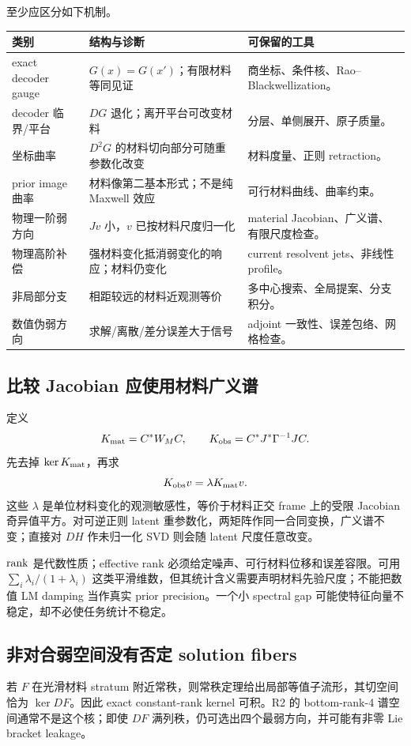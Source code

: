 至少应区分如下机制。
\begin{longtable}{p{.21\linewidth}p{.42\linewidth}p{.29\linewidth}}
\toprule
类别 & 结构与诊断 & 可保留的工具\\
\midrule
exact decoder gauge & $G(x)=G(x')$；有限材料等同见证 & 商坐标、条件核、Rao--Blackwellization。\\
decoder 临界/平台 & $DG$ 退化；离开平台可改变材料 & 分层、单侧展开、原子质量。\\
坐标曲率 & $D^2G$ 的材料切向部分可随重参数化改变 & 材料度量、正则 retraction。\\
prior image 曲率 & 材料像第二基本形式；不是纯 Maxwell 效应 & 可行材料曲线、曲率约束。\\
物理一阶弱方向 & $Jv$ 小，$v$ 已按材料尺度归一化 & material Jacobian、广义谱、有限尺度检查。\\
物理高阶补偿 & 强材料变化抵消弱变化的响应；材料仍变化 & current resolvent jets、非线性 profile。\\
非局部分支 & 相距较远的材料近观测等价 & 多中心搜索、全局提案、分支积分。\\
数值伪弱方向 & 求解/离散/差分误差大于信号 & adjoint 一致性、误差包络、网格检查。\\
\bottomrule
\end{longtable}

\subsection{比较 Jacobian 应使用材料广义谱}
定义
\[
K_{\rm mat}=C^*W_MC,\qquad
K_{\rm obs}=C^*J^*\Gamma^{-1}JC.
\]
先去掉 $\ker K_{\rm mat}$，再求
\begin{equation}
K_{\rm obs}v=\lambda K_{\rm mat}v.
\label{eq:material-generalized}
\end{equation}
这些 $\lambda$ 是单位材料变化的观测敏感性，等价于材料正交 frame 上的受限 Jacobian 奇异值平方。对可逆正则 latent 重参数化，两矩阵作同一合同变换，广义谱不变；直接对 $DH$ 作未归一化 SVD 则会随 latent 尺度任意改变。

$\operatorname{rank}$ 是代数性质；effective rank 必须给定噪声、可行材料位移和误差容限。可用 $\sum_i\lambda_i/(1+\lambda_i)$ 这类平滑维数，但其统计含义需要声明材料先验尺度；不能把数值 LM damping 当作真实 prior precision。一个小 spectral gap 可能使特征向量不稳定，却不必使任务统计不稳定。

\subsection{非对合弱空间没有否定 solution fibers}
若 $F$ 在光滑材料 stratum 附近常秩，则常秩定理给出局部等值子流形，其切空间恰为 $\ker DF$。因此 exact constant-rank kernel 可积。R2 的 bottom-rank-4 谱空间通常不是这个核；即使 $DF$ 满列秩，仍可选出四个最弱方向，并可能有非零 Lie bracket leakage。

